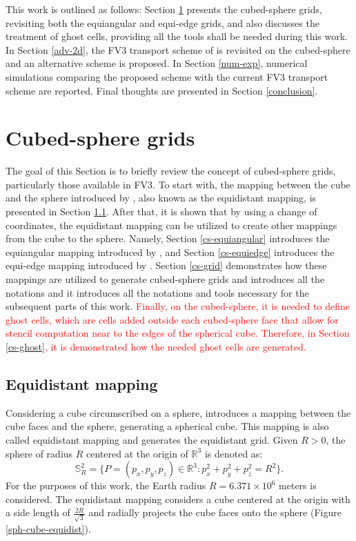 \documentclass[preprint,12pt]{elsarticle}
\begin{document}
\begin{linenumbers}
This work is outlined as follows:
Section \ref{cs-grids} presents the cubed-sphere grids, revisiting both the equiangular and equi-edge grids, and also discusses the treatment of ghost cells, providing all the tools shall be needed during this work.
In Section \ref{adv-2d}, the FV3 transport scheme of \cite{putman:2007} is revisited on the cubed-sphere and an alternative scheme is proposed.
In Section \ref{num-exp}, numerical simulations comparing the proposed scheme with the current FV3 transport scheme are reported.
Final thoughts are presented in Section \ref{conclusion}.

\newpage
\section{Cubed-sphere grids}
\label{cs-grids}
The goal of this Section is to briefly review the concept of cubed-sphere grids, particularly those available in FV3.
To start with, the mapping between the cube and the sphere introduced by \cite{sadourny:1972}, also known as the equidistant mapping, is presented in Section \ref{cs-equidistant}.
After that, it is shown that by using a change of coordinates, the equidistant mapping can be utilized to create other mappings from the cube to the sphere.
Namely, Section \ref{cs-equiangular} introduces the equiangular mapping introduced by \cite{ronchi:1996}, and Section \ref{cs-equiedge} introduces the equi-edge mapping introduced by \cite{chen:2021}. 
Section \ref{cs-grid} demonstrates how these mappings are utilized to generate cubed-sphere grids and introduces all the notations and it introduces all the notations and tools necessary for the subsequent parts of this work.
\textcolor{red}{
Finally, on the cubed-sphere, it is needed to define ghost cells, which are cells added outside each cubed-sphere face that allow for stencil computation near to the edges of the spherical cube.
Therefore, in Section \ref{cs-ghost}, it is demonstrated how the needed ghost cells are generated.
}
\subsection{Equidistant mapping}
\label{cs-equidistant}
Considering a cube circumscribed on a sphere, \cite{sadourny:1972} introduces a mapping between the cube faces and the sphere, generating a spherical cube.
This mapping is also called equidistant mapping and generates the equidistant grid.
Given $R>0$, the sphere of radius $R$ 
centered at the origin of  $\mathbb{R}^3$ is denoted as:
\begin{equation}
	\label{s2_r}
	\mathbb{S}^2_R = \{ P = (p_x,p_y,p_z) \in \mathbb{R}^3: p_x^2 + p_y^2 + p_z^2 = R^2\}.
\end{equation}
For the purposes of this work, the Earth radius $R=6.371\times 10^6$ meters is considered.
The equidistant mapping considers a cube centered at the origin with a side length of $\frac{2R}{\sqrt{3}}$ and radially projects the cube faces onto the sphere (Figure \ref{sph-cube-equidist}).


\end{linenumbers}
\end{document}
